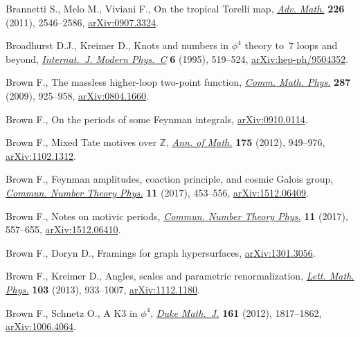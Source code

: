 \documentclass[pdftex]{sigma}%
\numberwithin{equation}{section}
\newcommand{\0}{\color{blue}{\mathsf{0}}}
\begin{document}
\begin{thebibliography}{99}
Brannetti S., Melo M., Viviani F., On the tropical {T}orelli map, \href{https://doi.org/10.1016/j.aim.2010.09.011}{\textit{Adv.
 Math.}} \textbf{226} (2011), 2546--2586, \href{https://arxiv.org/abs/0907.3324}{arXiv:0907.3324}.

Broadhurst D.J., Kreimer D., Knots and numbers in {$\phi^4$} theory to~{$7$}
 loops and beyond, \href{https://doi.org/10.1142/S012918319500037X}{\textit{Internat.~J. Modern Phys.~C}} \textbf{6} (1995),
 519--524, \href{https://arxiv.org/abs/hep-ph/9504352}{arXiv:hep-ph/9504352}.

Brown F., The massless higher-loop two-point function, \href{https://doi.org/10.1007/s00220-009-0740-5}{\textit{Comm. Math.
 Phys.}} \textbf{287} (2009), 925--958, \href{https://arxiv.org/abs/0804.1660}{arXiv:0804.1660}.

Brown F., On the periods of some {F}eynman integrals, \href{https://arxiv.org/abs/0910.0114}{arXiv:0910.0114}.

Brown F., Mixed {T}ate motives over {$\mathbb Z$}, \href{https://doi.org/10.4007/annals.2012.175.2.10}{\textit{Ann. of Math.}}
 \textbf{175} (2012), 949--976, \href{https://arxiv.org/abs/1102.1312}{arXiv:1102.1312}.

Brown F., Feynman amplitudes, coaction principle, and cosmic {G}alois group,
 \href{https://doi.org/10.4310/CNTP.2017.v11.n3.a1}{\textit{Commun. Number Theory Phys.}} \textbf{11} (2017), 453--556,
 \href{https://arxiv.org/abs/1512.06409}{arXiv:1512.06409}.

Brown F., Notes on motivic periods, \href{https://doi.org/10.4310/CNTP.2017.v11.n3.a2}{\textit{Commun. Number Theory Phys.}}
 \textbf{11} (2017), 557--655, \href{https://arxiv.org/abs/1512.06410}{arXiv:1512.06410}.

Brown F., Doryn D., Framings for graph hypersurfaces, \href{https://arxiv.org/abs/1301.3056}{arXiv:1301.3056}.

Brown F., Kreimer D., Angles, scales and parametric renormalization,
 \href{https://doi.org/10.1007/s11005-013-0625-6}{\textit{Lett. Math. Phys.}} \textbf{103} (2013), 933--1007,
 \href{https://arxiv.org/abs/1112.1180}{arXiv:1112.1180}.

Brown F., Schnetz O., A {K}3 in {$\phi^4$}, \href{https://doi.org/10.1215/00127094-1644201}{\textit{Duke Math.~J.}} \textbf{161}
 (2012), 1817--1862, \href{https://arxiv.org/abs/1006.4064}{arXiv:1006.4064}.


\end{thebibliography}
\end{document}
